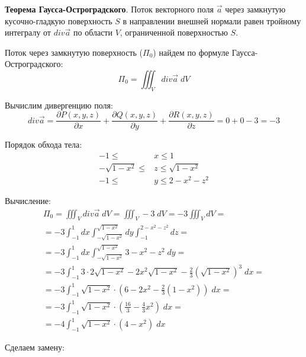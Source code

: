 \begin{enumerate}
    \textbf{Теорема Гаусса-Остроградского}. Поток векторного поля $\Vec{a}$ через замкнутую кусочно-гладкую поверхность  $S$  в направлении внешней нормали равен тройному интегралу от  $div \Vec{a}$  по области  $V$, ограниченной поверхностью  $S$.
    
    Поток через замкнутую поверхность ($\Pi_{0}$) найдем по формуле Гаусса-Остроградского:
    \begin{equation*}
        \Pi_{0} = \iiint_{V}div\Vec{a}\; dV
    \end{equation*}

    Вычислим дивергенцию поля:
    \begin{equation*}
        div\Vec{a} = \frac{\partial P(x,y,z)}{\partial x} + \frac{\partial Q(x,y,z)}{\partial y} + \frac{\partial R(x,y,z)}{\partial z} = 0 + 0 - 3 = -3
    \end{equation*}
    
    Порядок обхода тела:
    \begin{align*}
        -1 \leq &x \leq 1 \\
        -\sqrt{1-x^2} \leq &z \leq \sqrt{1-x^2} \\
        -1 \leq &y \leq 2 - x^2 - z^2
    \end{align*}

    Вычисление:
    \begin{align*}
        \Pi_{0} = \iiint_{V}div\Vec{a}\; dV = \iiint_{V}-3\; dV = -3\iiint_{V}dV =\\= 
        -3\int_{-1}^{1}dx\int_{-\sqrt{1-x^2}}^{\sqrt{1-x^2}}dy\int_{-1}^{2 - x^2 - z^2}dz =\\=
        -3\int_{-1}^{1}dx\int_{-\sqrt{1-x^2}}^{\sqrt{1-x^2}}3 - x^2 - z^2\; dy =\\=
        -3\int_{-1}^{1} 3\cdot2\sqrt{1-x^2} - 2x^2\sqrt{1-x^2} - \frac{2}{3}(\sqrt{1-x^2})^3\; dx =\\=
        -3\int_{-1}^{1} \sqrt{1-x^2}\cdot(6 - 2x^2 - \frac{2}{3}(1-x^2))\; dx =\\=
        -3\int_{-1}^{1} \sqrt{1-x^2}\cdot(\frac{16}{3} - \frac{4}{3}x^2)\; dx =\\=
        -4\int_{-1}^{1} \sqrt{1-x^2}\cdot(4 - x^2)\; dx
    \end{align*}

    Сделаем замену:
    

\end{enumerate}
